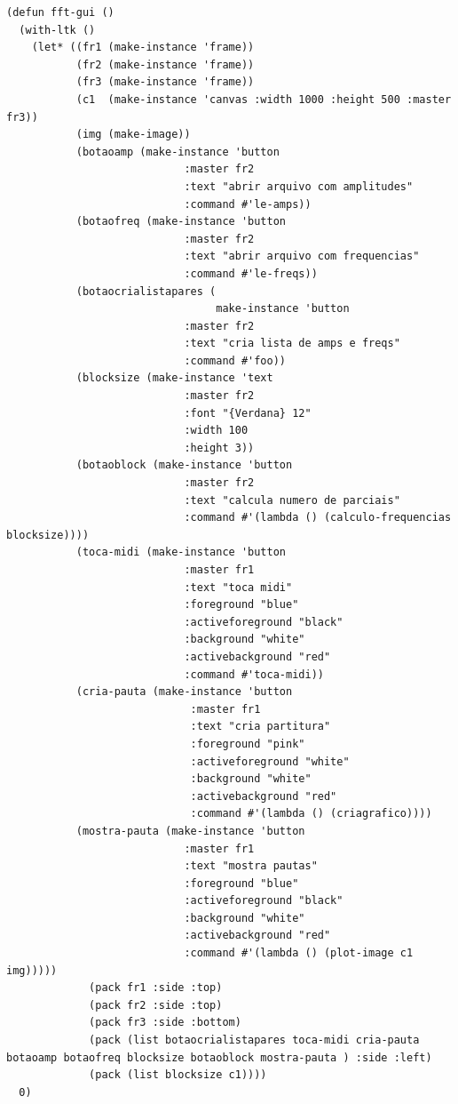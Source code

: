 \documentclass[draft]{ppgmus}
\begin{document}
\begin{verbatim}
(defun fft-gui ()
  (with-ltk ()
    (let* ((fr1 (make-instance 'frame))
           (fr2 (make-instance 'frame))
           (fr3 (make-instance 'frame))
           (c1  (make-instance 'canvas :width 1000 :height 500 :master fr3))
           (img (make-image))
           (botaoamp (make-instance 'button
                            :master fr2
                            :text "abrir arquivo com amplitudes"
                            :command #'le-amps))
           (botaofreq (make-instance 'button
                            :master fr2          
                            :text "abrir arquivo com frequencias"
                            :command #'le-freqs))
           (botaocrialistapares (
                                 make-instance 'button
                            :master fr2            
                            :text "cria lista de amps e freqs"
                            :command #'foo))
           (blocksize (make-instance 'text
                            :master fr2      
                            :font "{Verdana} 12"
                            :width 100
                            :height 3))
           (botaoblock (make-instance 'button
                            :master fr2
                            :text "calcula numero de parciais"
                            :command #'(lambda () (calculo-frequencias blocksize)))) 
           (toca-midi (make-instance 'button
                            :master fr1
                            :text "toca midi"
                            :foreground "blue"
                            :activeforeground "black"
                            :background "white"
                            :activebackground "red"
                            :command #'toca-midi))
           (cria-pauta (make-instance 'button
                             :master fr1
                             :text "cria partitura"
                             :foreground "pink"
                             :activeforeground "white"
                             :background "white"
                             :activebackground "red"
                             :command #'(lambda () (criagrafico))))
           (mostra-pauta (make-instance 'button
                            :master fr1
                            :text "mostra pautas"
                            :foreground "blue"
                            :activeforeground "black"
                            :background "white"
                            :activebackground "red"
                            :command #'(lambda () (plot-image c1 img)))))
             (pack fr1 :side :top)
             (pack fr2 :side :top)
             (pack fr3 :side :bottom)
             (pack (list botaocrialistapares toca-midi cria-pauta botaoamp botaofreq blocksize botaoblock mostra-pauta ) :side :left)
             (pack (list blocksize c1))))
  0)

\end{verbatim}
\end{document}
